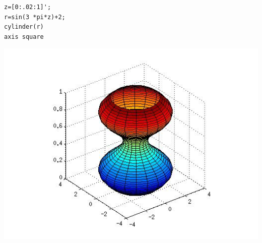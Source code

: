 \documentclass[11pt]{article}
\begin{document}
\begin{minipage}{0.4\textwidth}
\begin{verbatim}
z=[0:.02:1]';
r=sin(3 *pi*z)+2;
cylinder(r)
axis square
\end{verbatim} 
\end{minipage}
\begin{minipage}{0.5\textwidth}
 \begin{center}
      \includegraphics[width=\textwidth]{./cilindro.jpg}
 \end{center}
\end{minipage}
\end{document}

